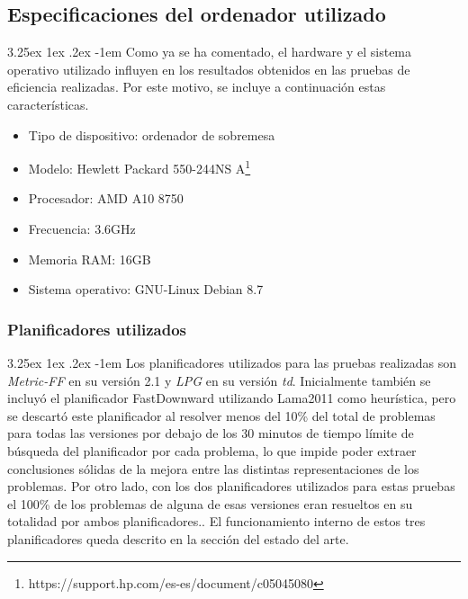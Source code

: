 \documentclass{article}
\makeatletter
\renewcommand\paragraph{\@startsection{paragraph}{5}{\z@}%
      {3.25ex \@plus1ex \@minus.2ex}%
      {-1em}%
      {\normalfont\normalsize\bfseries}}
\makeatother
\begin{document}
    \subsection{Especificaciones del ordenador utilizado}
    \paragraph{}
    Como ya se ha comentado, el hardware y el sistema operativo utilizado influyen en los resultados obtenidos en las pruebas de eficiencia realizadas. Por este motivo, se incluye a continuación estas características.
    
    \begin{itemize}
        \item Tipo de dispositivo: ordenador de sobremesa
        \item Modelo: Hewlett Packard 550-244NS A\footnote{https://support.hp.com/es-es/document/c05045080}
        \item Procesador: AMD A10 8750 
        \item Frecuencia: 3.6GHz
        \item Memoria RAM: 16GB
        \item Sistema operativo: GNU-Linux Debian 8.7
    \end{itemize}
    
    \subsubsection{Planificadores utilizados}
    \paragraph{}
    Los planificadores utilizados para las pruebas realizadas son \textit{Metric-FF} en su versión 2.1 y \textit{LPG} en su versión \textit{td}. Inicialmente también se incluyó el planificador FastDownward utilizando Lama2011 como heurística, pero se descartó este planificador al resolver menos del 10\% del total de problemas para todas las versiones por debajo de los 30 minutos de tiempo límite de búsqueda del planificador por cada problema, lo que impide poder extraer conclusiones sólidas de la mejora entre las distintas representaciones de los problemas. Por otro lado, con los dos planificadores utilizados para estas pruebas el 100\% de los problemas de alguna de esas versiones eran resueltos en su totalidad por ambos planificadores.. El funcionamiento interno de estos tres planificadores queda descrito en la sección del estado del arte.
    
\end{document}
